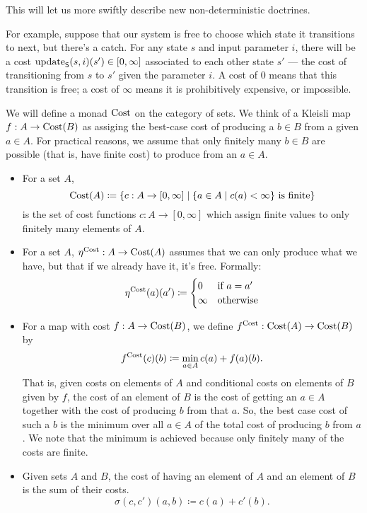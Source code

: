 \documentclass[DynamicalBook]{subfiles}
\begin{document}
This will let us more swiftly describe new non-deterministic doctrines.

For
example, suppose that our system is free to choose which state it transitions
to next, but there's a catch. For any state $s$ and input parameter $i$, there
will be a cost $\mathrm{update}_{\mathsf{S}}(s, i)(s') \in [0, \infty]$ associated to each other state $s'$ ---
the cost of transitioning from $s$ to $s'$ given the parameter $i$. A cost of
$0$ means that this transition is free; a cost of $\infty$ means it is
prohibitively expensive, or impossible.


\begin{definition}\label{def.cost_monad}
  We will define a monad $\mathrm{Cost}$ on the category of sets. We think of a Kleisli map $f : A \to \mathrm{Cost} ( B )$ as
  assiging the best-case cost of producing a $b \in B$ from a given $a \in A$.
  For practical reasons, we assume that only finitely many $b \in B$ are
  possible (that is, have finite cost) to produce from an $a \in A$.

  \begin{itemize}
  \item For a set $A$,
    \[
\mathrm{Cost}(A) \coloneqq \{c : A \to [0, \infty] \mid \mbox{$\{a \in A \mid c(a) <
  \infty\}$ is finite}\}
    \]
    is the set of cost functions $c : A \to [0, \infty]$ which assign finite
    values to only finitely many elements of $A$.
  \item For a set $A$, $\eta^{\mathrm{Cost}} : A \to \mathrm{Cost}(A)$ assumes that we
    can only produce what we have, but that if we already have it, it's free. Formally:
\[
\eta^{\mathrm{Cost}}(a)(a') \coloneqq \begin{cases} 0 &\mbox{if $a = a'$} \\
  \infty &\mbox{otherwise}\end{cases}
\]

  \item For a map with cost $f : A \to \mathrm{Cost}(B)$, we define
      $f^{\mathrm{Cost}} : \mathrm{Cost}(A) \to \mathrm{Cost}(B)$ by
      \[
f^{\mathrm{Cost}}(c)(b) \coloneqq \min_{a \in A} c(a) + f(a)(b).
      \]
That is, given costs on elements of $A$ and conditional costs on elements of $B$
given by $f$, the cost of an element of $B$ is the cost of getting an $a \in A$
together with the cost of producing $b$ from that $a$. So, the best case cost of
such a $b$ is the minimum over all $a \in A$ of the total cost of producing $b$
from $a$. We note that the minimum is achieved because only finitely many of the
costs are finite.
  \item Given sets $A$ and $B$, the cost of having an element of $A$ and an
    element of $B$ is the sum of their costs.
    $$\sigma(c, c')(a, b) \coloneqq c(a) + c'(b).$$
  \end{itemize}
\end{definition}
\end{document}
